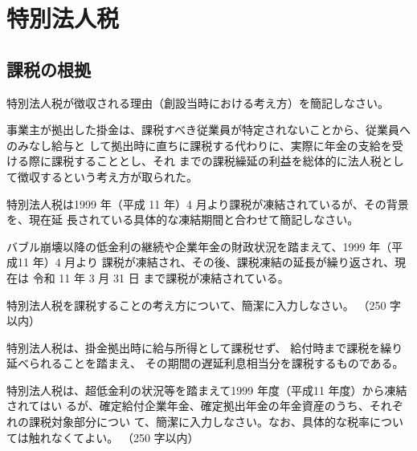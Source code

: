 \newcommand{\TouketsuDate}{令和 11 年 3 月 31 日}


\section{特別法人税}

\subsection{課税の根拠}

\begin{shortanswer}[年金1 2020 問題2(4)\textcircled{1}]
  特別法人税が徴収される理由（創設当時における考え方）を簡記しなさい。
\end{shortanswer}

\begin{answerbox}
  事業主が拠出した掛金は、課税すべき従業員が特定されないことから、従業員へのみなし給与と
して拠出時に直ちに課税する代わりに、実際に年金の支給を受ける際に課税することとし、それ
までの課税繰延の利益を総体的に法人税として徴収するという考え方が取られた。
\end{answerbox}

\begin{shortanswer}[年金1 2020 問題2(4)\textcircled{2}]
特別法人税は1999 年（平成 11 年）4 月より課税が凍結されているが、その背景を、現在延
長されている具体的な凍結期間と合わせて簡記しなさい。
\end{shortanswer}

\begin{answerbox}
  バブル崩壊以降の低金利の継続や企業年金の財政状況を踏まえて、1999 年（平成11 年）4 月より
課税が凍結され、その後、課税凍結の延長が繰り返され、現在は \TouketsuDate 
まで課税が凍結されている。
\end{answerbox}

\begin{shortanswer}[年金1 2023 問題2(5)ア]
 特別法人税を課税することの考え方について、簡潔に入力しなさい。 （250 字以内）
\end{shortanswer}

\begin{answerbox}
特別法人税は、掛金拠出時に給与所得として課税せず、
給付時まで課税を繰り延べられることを踏まえ、
その期間の遅延利息相当分を課税するものである。
\end{answerbox}

\begin{shortanswer}[年金1 2023 問題2(5)ア]
特別法人税は、超低金利の状況等を踏まえて1999 年度（平成11 年度）から凍結されてはい
るが、確定給付企業年金、確定拠出年金の年金資産のうち、それぞれの課税対象部分につい
て、簡潔に入力しなさい。なお、具体的な税率については触れなくてよい。 （250 字以内）
\end{shortanswer}

